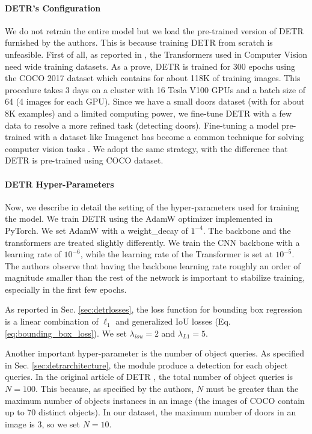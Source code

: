 \paragraph{DETR's Configuration}
\label{sec:detr_configuration}
We do not retrain the entire model but we load the pre-trained version of DETR furnished by the authors. This is because training DETR from scratch is unfeasible. First of all, as reported in \cite{surveytransformer}, the Transformers used in Computer Vision need wide training datasets. As a prove, DETR is trained for 300 epochs using the COCO 2017 dataset \cite{coco} which contains for about 118K of training images. This procedure takes 3 days on a cluster with 16 Tesla V100 GPUs and a batch size of 64 (4 images for each GPU). Since we have a small doors dataset (with for about 8K examples) and a limited computing power, we fine-tune DETR with a few data to resolve a more refined task (detecting doors). Fine-tuning a model pre-trained with a dataset like Imagenet \cite{imagenet} has become a common technique for solving computer vision tasks \cite{verydeepimagenet, resnet, fasterrcnn, yolo, yolov2}. We adopt the same strategy, with the difference that DETR is pre-trained using COCO dataset.

\paragraph{DETR Hyper-Parameters}
Now, we describe in detail the setting of the hyper-parameters used for training the model. We train DETR using the AdamW  \cite{adamw} optimizer implemented in PyTorch. We set AdamW with a \textsf{weight\_decay} of $1^{-4}$. The backbone and the transformers are treated slightly differently.  We train the CNN backbone with a learning rate of $10^{-6}$, while the learning rate of the Transformer is set at $10^{-5}$. The authors observe that having the backbone learning rate roughly an order of magnitude smaller than the rest of the network is important to stabilize training, especially in the first few epochs. 

As reported in Sec. \ref{sec:detrlosses}, the loss function for bounding box regression is a linear combination of $\ell_1$ and generalized IoU \cite{generalizediou} losses (Eq. \ref{eq:bounding_box_loss}). We set $\lambda_{iou} = 2$ and $\lambda_{L1} = 5$.

Another important hyper-parameter is the number of object queries. As specified in Sec. \ref{sec:detrarchitecture}, the module produce a detection for each object queries. In the original article of DETR \cite{detr}, the total number of object queries is  $N = 100$. This because, as specified by the authors, $N$ must be greater than the maximum number of objects instances in an image (the images of COCO contain up to 70 distinct objects). In our dataset, the maximum number of doors in an image is 3, so we set $N = 10$.

